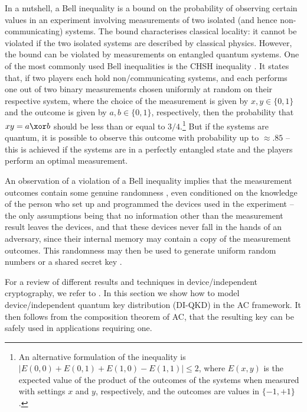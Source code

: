In a nutshell, a Bell inequality is a bound on the probability of
observing certain values in an experiment involving measurements of two isolated (and hence non-communicating) systems. The bound characterises classical locality: it cannot be violated if
the two isolated systems are described by classical physics. However, the bound can be violated by measurements on entangled quantum systems.   One of the most commonly used Bell inequalities is the
CHSH inequality \cite{CHSH69}. It states that, if two players each
hold non\-/communicating systems, and each performs one out of two
binary measurements chosen uniformly at random on their respective
system, where the choice of the measurement is given by
$x,y \in \{0,1\}$ and the outcome is given by $a,b \in \{0,1\}$,
respectively, then the probability that $xy = a \xor b$ should be less than
or equal to $3/4$.\footnote{An alternative formulation of the
  inequality is
  $\left| E(0,0) + E(0,1) + E(1,0) - E(1,1) \right| \leq 2$, where
  $E(x,y)$ is the expected value of the product of the outcomes of the
  systems when measured with settings $x$ and $y$, respectively, and
  the outcomes are values in $\{-1,+1\}$.} But if the systems are
quantum, it is possible to observe this outcome with probability up to
$\approx .85$ \--- this is achieved if the systems are in a perfectly
entangled state and the players perform an optimal measurement.

An observation of a violation of a Bell inequality implies that the
measurement outcomes contain some genuine randomness
\cite{Col06,PAM10,AMP12,CR12}, even conditioned on the knowledge of
the person who set up and programmed the devices used in the
experiment \--- the only assumptions being that no information other
than the measurement result leaves the devices, and that these devices
never fall in the hands of an adversary, since their internal memory
may contain a copy of the measurement outcomes. This randomness may
then be used to generate uniform random numbers
\cite{VV12,CSW14,MS14,BRGHHHSW16,KAF20} or a shared secret key
\cite{BHK05,PABGMS09,VV14,ADFRV18,AFRV19}.

For a review of different results and techniques in
device\-/independent cryptography, we refer to \textcite{ER14}. In
this section we show how to model device\-/independent quantum key
distribution (DI-QKD) in the AC framework. It then follows from the
composition theorem of AC, that the resulting key can be safely used
in applications requiring one.


